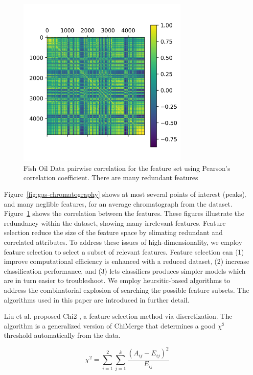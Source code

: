 \documentclass[runningheads]{llncs}
\begin{document}
\begin{figure}[htb]
  \centering
  \includegraphics[width=8.5cm]{fish_correlation_matrix.png}
  \caption{
    Fish Oil Data pairwise correlation for the feature set using Pearson's correlation coefficient.
    There are many redundant features
    }
  \label{fig:correlation-matrix} 
  \captionsetup[figure]{font=small,labelfont=small}
\end{figure}

Figure~\ref{fig:gas-chromatography} shows at most several points of interest (peaks), and many neglible features, for an average chromatograph from the dataset. 
Figure~\ref{fig:correlation-matrix} shows the correlation between the features.
These figures illustrate the redundancy within the dataset, showing many irrelevant features. 
Feature selection reduce the size of the feature space by elimating redundant and correlated attributes. 
To address these issues of high-dimensionality, we employ feature selection to select a subset of relevant features. 
Feature selection can (1) improve computational efficiency is enhanced with a reduced dataset, (2) increase classification performance, and (3) lets classifiers produces simpler models which are in turn easier to troubleshoot.
We employ heursitic-based algorithms to address the combinatorial explosion of searching the possible feature subsets.
The algorithms used in this paper are introduced in further detail.

Liu et al. proposed Chi2 \cite{liu1995chi2}, a feature selection method via discretization. 
The algorithm is a generalized version of ChiMerge \cite{kerber1992chimerge} that determines a good $\chi^2$ threshold automatically from the data.

\begin{equation}
  \chi^2 = \sum_{i=1}^2 \sum_{j=1}^k \frac{(A_{ij} - E_{ij})^2}{E_{ij}}
  \label{eq:chi}
\end{equation}
\end{document}
